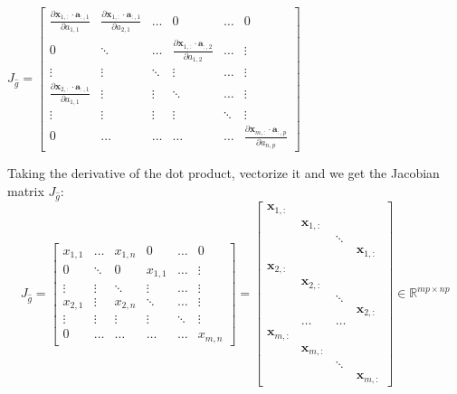 \documentclass{article}
\begin{document}
\begin{center}$
J_{\widehat{g}} = \begin{bmatrix}
    \frac{\partial \mathbf{x}_{1,:} \cdot \mathbf{a}_{:,1}}{\partial a_{1,1}} & \frac{\partial \mathbf{x}_{1,:} \cdot \mathbf{a}_{:,1}}{\partial a_{2,1}} &\hdots &  0 &\hdots & 0 \\
    0  & \ddots &\hdots & \frac{\partial \mathbf{x}_{1,:} \cdot \mathbf{a}_{:,2}}{\partial a_{1,2}}& \hdots& \vdots \\
    \vdots & \vdots & \ddots & \vdots & \hdots & \vdots\\
    \frac{\partial \mathbf{x}_{2,:} \cdot \mathbf{a}_{:,1}}{\partial a_{1,1}} & \vdots & \vdots & \ddots & \hdots & \vdots\\
    \vdots & \vdots & \vdots & \vdots & \ddots & \vdots\\
    0  & \hdots & \hdots & \hdots & \hdots & \frac{\partial \mathbf{x}_{m,:} \cdot \mathbf{a}_{:,p}}{\partial a_{n,p}}
\end{bmatrix}
$
\end{center}
Taking the derivative of the dot product, vectorize it and we get the Jacobian matrix $J_{\widehat{g}}$:
\begin{equation}
J_{\widehat{g}} = \begin{bmatrix}
    x_{1,1} &\hdots & x_{1,n}&  0 &\hdots & 0 \\
    0   &\ddots & 0 &x_{1,1}& \hdots& \vdots \\
    \vdots & \vdots & \ddots & \vdots & \hdots & \vdots\\
    x_{2,1}  & \vdots & x_{2,n} & \ddots & \hdots & \vdots\\
    \vdots & \vdots & \vdots & \vdots & \ddots & \vdots\\
    0  & \hdots & \hdots & \hdots & \hdots & x_{m,n}
\end{bmatrix} = \begin{bmatrix}
     \mathbf{x}_{1,:}  & &   &  \\
      & \mathbf{x}_{1,:} & &  \\
     &  & \ddots &\\
     &  &  & \mathbf{x}_{1,:}\\
    \mathbf{x}_{2,:}  & &   &  \\
      & \mathbf{x}_{2,:} & &  \\
     &  & \ddots &\\
     &  &  & \mathbf{x}_{2,:}\\
     & \hdots& \hdots &\\
     \mathbf{x}_{m,:}  & &   &  \\
      & \mathbf{x}_{m,:} & &  \\
     &  & \ddots &\\
     &  &  & \mathbf{x}_{m,:}
\end{bmatrix}
\in \mathbb{R}^{mp \times np}
\end{equation}
\end{document}
